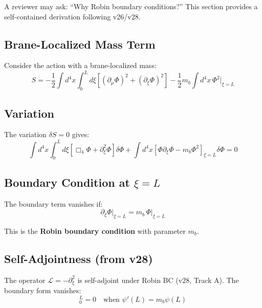 \documentclass[11pt,a4paper]{article}
\newcommand{\mb}{m_b}
\theoremstyle{definition}
\theoremstyle{plain}
\theoremstyle{remark}
\begin{document}
A reviewer may ask: ``Why Robin boundary conditions?'' This section provides a
self-contained derivation following v26/v28.

\subsection{Brane-Localized Mass Term}

Consider the action with a brane-localized mass:
\begin{equation}
S = -\frac{1}{2}\int d^4x \int_0^L d\xi \left[(\partial_\mu\Phi)^2 + (\partial_\xi\Phi)^2\right]
- \frac{1}{2}\mb \int d^4x \, \Phi^2\big|_{\xi=L}
\label{eq:action-brane-mass}
\end{equation}

\subsection{Variation}

The variation $\delta S = 0$ gives:
\begin{equation}
\int d^4x \int_0^L d\xi \left[\Box_4\Phi + \partial_\xi^2\Phi\right]\delta\Phi
+ \int d^4x \left[\Phi\partial_\xi\Phi - \mb\Phi^2\right]_{\xi=L}\delta\Phi = 0
\label{eq:variation}
\end{equation}

\subsection{Boundary Condition at $\xi = L$}

The boundary term vanishes if:
\begin{equation}
\partial_\xi\Phi\big|_{\xi=L} = \mb \, \Phi\big|_{\xi=L}
\label{eq:robin-bc}
\end{equation}

This is the \textbf{Robin boundary condition} with parameter $\mb$.

\subsection{Self-Adjointness (from v28)}

The operator $\mathcal{L} = -\partial_\xi^2$ is self-adjoint under Robin BC (v28, Track A).
The boundary form vanishes:
\begin{equation}
[\phi^*\psi' - (\phi')^*\psi]_0^L = 0 \quad \text{when } \psi'(L) = \mb\psi(L)
\label{eq:sa-robin}
\end{equation}
\end{document}
